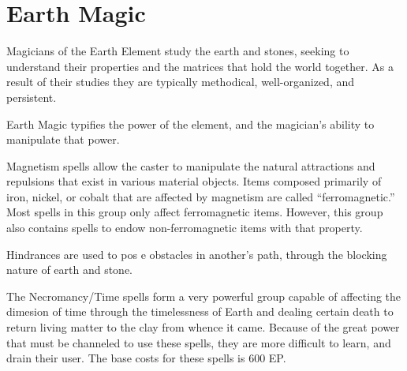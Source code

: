 \chapter{Earth Magic}
\label{ch:elemental-earth-magic}

Magicians of the Earth Element study the earth and stones, seeking to understand their properties and the matrices that hold the world together. As a result of their studies they are typically methodical, well-organized, and persistent.

Earth Magic typifies the power of the element, and the magician’s ability to manipulate that power.

Magnetism spells allow the caster to manipulate the natural attractions and repulsions that exist in various material objects. Items composed primarily of iron, nickel, or cobalt that are affected by magnetism are called “ferromagnetic.” Most spells in this group only affect ferromagnetic items. However, this group also contains spells to endow non-ferromagnetic items with that property.

Hindrances are used to pos e obstacles in another’s path, through the blocking nature of earth and stone.

The Necromancy/Time spells form a very powerful group capable of affecting the dimesion of time through the timelessness of Earth and dealing certain death to return living matter to the clay from whence it came. Because of the great power that must be channeled to use these spells, they are more difficult to learn, and drain their user. The base costs for these spells is 600 EP.

